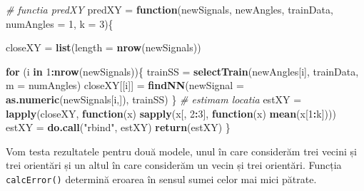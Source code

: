 \documentclass[]{article}
\newenvironment{Shaded}{\begin{snugshade}}{\end{snugshade}}
\newcommand{\KeywordTok}[1]{\textcolor[rgb]{0.13,0.29,0.53}{\textbf{#1}}}
\newcommand{\DataTypeTok}[1]{\textcolor[rgb]{0.13,0.29,0.53}{#1}}
\newcommand{\DecValTok}[1]{\textcolor[rgb]{0.00,0.00,0.81}{#1}}
\newcommand{\StringTok}[1]{\textcolor[rgb]{0.31,0.60,0.02}{#1}}
\newcommand{\CommentTok}[1]{\textcolor[rgb]{0.56,0.35,0.01}{\textit{#1}}}
\newcommand{\ControlFlowTok}[1]{\textcolor[rgb]{0.13,0.29,0.53}{\textbf{#1}}}
\newcommand{\OperatorTok}[1]{\textcolor[rgb]{0.81,0.36,0.00}{\textbf{#1}}}
\newcommand{\NormalTok}[1]{#1}
\begin{document}
\begin{Shaded}
\begin{Highlighting}[]
\CommentTok{# functia predXY}
\NormalTok{predXY =}\StringTok{ }\ControlFlowTok{function}\NormalTok{(newSignals, newAngles, trainData, }
                  \DataTypeTok{numAngles =} \DecValTok{1}\NormalTok{, }\DataTypeTok{k =} \DecValTok{3}\NormalTok{)\{}
  
\NormalTok{  closeXY =}\StringTok{ }\KeywordTok{list}\NormalTok{(}\DataTypeTok{length =} \KeywordTok{nrow}\NormalTok{(newSignals))}
  
  \ControlFlowTok{for}\NormalTok{ (i }\ControlFlowTok{in} \DecValTok{1}\OperatorTok{:}\KeywordTok{nrow}\NormalTok{(newSignals))\{}
\NormalTok{    trainSS =}\StringTok{ }\KeywordTok{selectTrain}\NormalTok{(newAngles[i], trainData, }\DataTypeTok{m =}\NormalTok{ numAngles)}
\NormalTok{    closeXY[[i]] =}\StringTok{ }\KeywordTok{findNN}\NormalTok{(}\DataTypeTok{newSignal =} \KeywordTok{as.numeric}\NormalTok{(newSignals[i,]), trainSS)}
\NormalTok{  \}}
  \CommentTok{# estimam locatia }
\NormalTok{  estXY =}\StringTok{ }\KeywordTok{lapply}\NormalTok{(closeXY, }\ControlFlowTok{function}\NormalTok{(x) }\KeywordTok{sapply}\NormalTok{(x[, }\DecValTok{2}\OperatorTok{:}\DecValTok{3}\NormalTok{], }
                                             \ControlFlowTok{function}\NormalTok{(x) }\KeywordTok{mean}\NormalTok{(x[}\DecValTok{1}\OperatorTok{:}\NormalTok{k])))}
\NormalTok{  estXY =}\StringTok{ }\KeywordTok{do.call}\NormalTok{(}\StringTok{"rbind"}\NormalTok{, estXY)}
  \KeywordTok{return}\NormalTok{(estXY)}
\NormalTok{\}}
\end{Highlighting}
\end{Shaded}

Vom testa rezultatele pentru două modele, unul în care considerăm trei
vecini și trei orientări și un altul în care considerăm un vecin și trei
orientări. Funcția \texttt{calcError()} determină eroarea în sensul
sumei celor mai mici pătrate.
\end{document}
